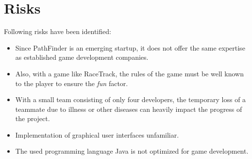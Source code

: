 \section{Risks}
	Following risks have been identified:
	\begin{itemize}
		\item Since PathFinder is an emerging startup, it does not offer the same expertise as established game development companies.
		\item Also, with a game like RaceTrack, the rules of the game must be well known to the player to ensure the \textit{fun} factor.
		\item With a small team consisting of only four developers, the temporary loss of a teammate due to illness or other diseases can heavily impact the progress of the project.
		\item Implementation of graphical user interfaces unfamiliar.
		\item The used programming language Java is not optimized for game development.
	\end{itemize}